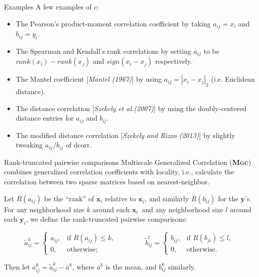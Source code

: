 \documentclass{beamer}
\newcommand{\G}{c}
\providecommand{\mb}[1]{\boldsymbol{#1}}
\providecommand{\sct}[1]{{\normalfont\textsc{#1}}}
\providecommand{\mt}[1]{\widetilde{#1}}
\newcommand{\Mgc}{\textbf{\sct{Mgc}}}
\newcommand{\mby}{\ensuremath{\mb{y}}}
\begin{document}
\begin{frame}{Examples}
A few examples of $\G$:
\begin{itemize}[<+->]
\item The Pearson's product-moment correlation coefficient by taking $a_{ij}=x_i$ and $b_{ij}=y_i$.
\item The Spearman and Kendall's rank correlations by setting $a_{ij}$ to be $rank(x_i)-rank(x_j)$ and $sign(x_i-x_j)$ respectively.
\item The Mantel coefficient [\textit{Mantel (1967)}]\cite{Mantel1967} by using $a_{ij}=|x_i-x_j|_{2}$ (i.e. Euclidean distance).
\item The distance correlation [\textit{Szekely et al.(2007)}]\cite{SzekelyRizzoBakirov2007} by using the doubly-centered distance entries for $a_{ij}$ and $b_{ij}$.
\item The modified distance correlation [\textit{Szekely and Rizzo (2013)}] \cite{SzekelyRizzo2013a} by slightly tweaking $a_{ij}/b_{ij}$ of dcorr.
\end{itemize}
\end{frame}

\begin{frame}{Rank-truncated pairwise comparisons}
Multiscale Generalized Correlation (\Mgc) combines generalized correlation coefficients with locality, i.e., calculate the correlation between two sparse matrices based on nearest-neighbor.

\pause
\medskip
Let $R(a_{ij})$  be the ``rank'' of $\mb{x}_i$ relative to $\mb{x}_j$, and similarly $R(b_{ij})$ for the \mby's. For any neighborhood size $k$ around each $\mb{x}_i$~and any neighborhood size $l$ around each $\mb{y}_i$, we define the rank-truncated pairwise comparisons:

\pause
\begin{equation}
\label{localCoef2}
    \mt{a}_{ij}^k=
    \begin{cases}
      a_{ij}, & \text{if } R(a_{ij}) \leq k, \\
      0, & \text{otherwise};
    \end{cases} \qquad \qquad
    \mt{b}_{ij}^l=
    \begin{cases}
      b_{ij}, & \text{if } R(b_{ji}) \leq l, \\
      0, & \text{otherwise}.
    \end{cases}
\end{equation}

\pause
Then let $a^k_{ij}=\mt{a}^k_{ij} - \bar{a}^k$, where $\bar{a}^k$ is the mean, and $b^k_{ij}$ similarly.
\end{frame}
\end{document}
